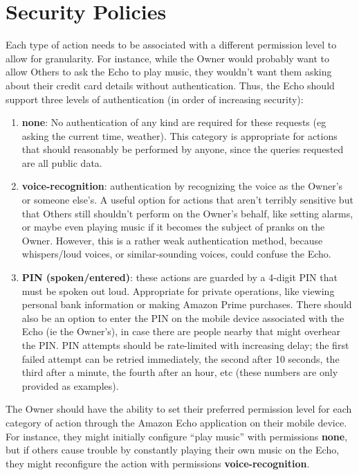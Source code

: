 \documentclass[11pt]{article}
\begin{document}
\section{Security Policies}
Each type of action needs to be associated with a different permission level to allow for granularity. For instance, while the Owner would probably want to allow Others to ask the Echo to play music, they wouldn't want them asking about their credit card details without authentication. Thus, the Echo should support three levels of authentication (in order of increasing security):

\begin{enumerate}
    \item \textbf{none}: No authentication of any kind are required for these requests (eg asking the current time, weather). This category is appropriate for actions that should reasonably be performed by anyone, since the queries requested are all public data.
    
    \item \textbf{voice-recognition}: authentication by recognizing the voice as the Owner's or someone else's. A useful option for actions that aren't terribly sensitive but that Others still shouldn't perform on the Owner's behalf, like setting alarms, or maybe even playing music if it becomes the subject of pranks on the Owner. However, this is a rather weak authentication method, because whispers/loud voices, or similar-sounding voices, could confuse the Echo. 
    
    \item \textbf{PIN (spoken/entered)}: these actions are guarded by a 4-digit PIN that must be spoken out loud. Appropriate for private operations, like viewing personal bank information or making Amazon Prime purchases. There should also be an option to enter the PIN on the mobile device associated with the Echo (ie the Owner's), in case there are people nearby that might overhear the PIN. PIN attempts should be rate-limited with increasing delay; the first failed attempt can be retried immediately, the second after 10 seconds, the third after a minute, the fourth after an hour, etc (these numbers are only provided as examples).
\end{enumerate}

The Owner should have the ability to set their preferred permission level for each category of action through the Amazon Echo application on their mobile device. For instance, they might initially configure ``play music'' with permissions \textbf{none}, but if others cause trouble by constantly playing their own music on the Echo, they might reconfigure the action with permissions \textbf{voice-recognition}.
\end{document}
